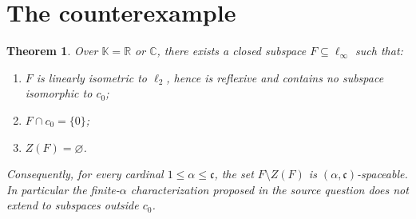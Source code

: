 \documentclass[11pt]{article}
\newtheorem{theorem}{Theorem}
\newcommand{\K}{\mathbb K}
\newcommand{\cC}{\mathfrak c}
\begin{document}
\section{The counterexample}

\begin{theorem}\label{thm:counterexample}
Over $\K=\mathbb R$ or $\mathbb C$, there exists a closed subspace
$F\subseteq\ell_\infty$ such that:
\begin{enumerate}
 \item $F$ is linearly isometric to $\ell_2$, hence is reflexive and contains
       no subspace isomorphic to $c_0$;
 \item $F\cap c_0=\{0\}$;
 \item $Z(F)=\varnothing$.
\end{enumerate}
Consequently, for every cardinal $1\le\alpha\le\cC$, the set
$F\setminus Z(F)$ is $(\alpha,\cC)$-spaceable.  In particular the
finite-$\alpha$ characterization proposed in the source question does not
extend to subspaces outside $c_0$.
\end{theorem}
\end{document}
